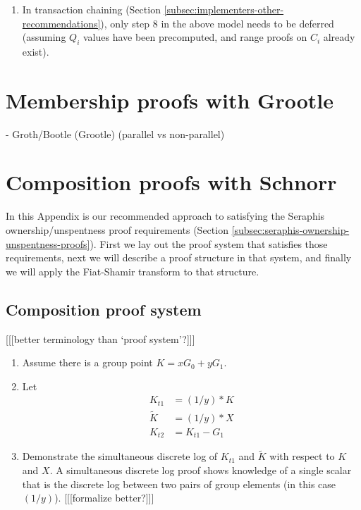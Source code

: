 \begin{appendices}
\begin{enumerate}
    \item In transaction chaining (Section \ref{subsec:implementers-other-recommendations}), only step 8 in the above model needs to be deferred (assuming $Q_i$ values have been precomputed, and range proofs on $C_i$ already exist).
\end{enumerate}



\section{Membership proofs with Grootle}
\label{appendix:membership-with-grootle}

- Groth/Bootle (Grootle) (parallel vs non-parallel)



\section{Composition proofs with Schnorr}
\label{appendix:composition-with-schnorr}

In this Appendix is our recommended approach to satisfying the Seraphis ownership/unspentness proof requirements (Section \ref{subsec:seraphis-ownership-unspentness-proofs}). First we lay out the proof system that satisfies those requirements, next we will describe a proof structure in that system, and finally we will apply the Fiat-Shamir transform \cite{fiat-shamir-transform} to that structure.


\subsection{Composition proof system}
\label{appendix:composition-proof-system}

[[[better terminology than `proof system'?]]]

\begin{enumerate}
    \item Assume there is a group point $K = x G_0 + y G_1$.

    \item Let\vspace{.115cm}
    \begin{align*}
        K_{t1} &= (1/y)*K \\
        \tilde{K} &= (1/y)*X \\
        K_{t2} &= K_{t1} - G_1
    \end{align*}

    \item Demonstrate the simultaneous discrete log of $K_{t1}$ and $\tilde{K}$ with respect to $K$ and $X$. A simultaneous discrete log proof shows knowledge of a single scalar that is the discrete log between two pairs of group elements (in this case $(1/y)$). [[[formalize better?]]]


\end{enumerate}
\end{appendices}
